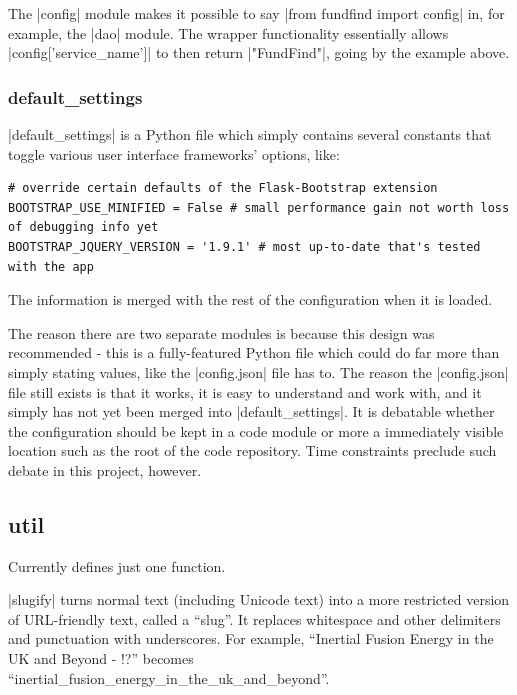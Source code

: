 The |config| module makes it possible to say |from fundfind import config| in, for example, the |dao| module. The wrapper functionality essentially allows |config['service_name']| to then return |"FundFind"|, going by the example above.

\subsubsection{default\_settings}
|default_settings| is a Python file which simply contains several constants that toggle various user interface frameworks' options, like:

\begin{verbatim}
# override certain defaults of the Flask-Bootstrap extension
BOOTSTRAP_USE_MINIFIED = False # small performance gain not worth loss of debugging info yet
BOOTSTRAP_JQUERY_VERSION = '1.9.1' # most up-to-date that's tested with the app
\end{verbatim}

The information is merged with the rest of the configuration when it is loaded.

The reason there are two separate modules is because this design was recommended - this is a fully-featured Python file which could do far more than simply stating values, like the |config.json| file has to. The reason the |config.json| file still exists is that it works, it is easy to understand and work with, and it simply has not yet been merged into |default_settings|. It is debatable whether the configuration should be kept in a code module or more a immediately visible location such as the root of the code repository. Time constraints preclude such debate in this project, however.

\subsection{util}
Currently defines just one function.

|slugify| turns normal text (including Unicode text) into a more restricted version of URL-friendly text, called a ``slug''. It replaces whitespace and other delimiters and punctuation with underscores. For example, ``Inertial Fusion Energy  in the UK and Beyond       -  !?'' becomes ``inertial\_fusion\_energy\_in\_the\_uk\_and\_beyond''.

